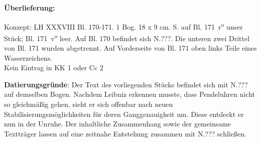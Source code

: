       
               
                \begin{ledgroupsized}[r]{120mm}
                \footnotesize 
                \pstart                
                \noindent\textbf{\"{U}berlieferung:}   
                \pend
                \end{ledgroupsized}
            
              
                            \begin{ledgroupsized}[r]{114mm}
                            \footnotesize 
                            \pstart \parindent -6mm
                            Konzept: LH XXXVIII Bl. 170-171. 1 Bog. 18 x 9 cm.  S. auf Bl. 171~r\textsuperscript{o} unser St\"{u}ck; Bl. 171~v\textsuperscript{o} leer. Auf Bl. 170 befindet sich N.???. Die unteren zwei Drittel von Bl. 171 wurden abgetrennt. Auf Vorderseite von Bl. 171 oben links Teile eines Wasserzeichens. \\Kein Eintrag in KK 1 oder Cc 2 \pend
                            \end{ledgroupsized}
                \vspace*{5mm}
                \begin{ledgroup}
                \footnotesize 
                \pstart
            \noindent\footnotesize{\textbf{Datierungsgr\"{u}nde}: Der Text des vorliegenden St\"{u}cks befindet sich mit N.??? auf demselben Bogen. Nachdem Leibniz erkennen musste, dass Pendeluhren nicht so gleichm\"{a}\ss{}ig gehen, sieht er sich offenbar nach neuen Stabilisierungsm\"{o}glichkeiten f\"{u}r deren Ganggenauigkeit um. Diese entdeckt er nun in der Unruhe. Der inhaltliche Zusammenhang sowie der gemeinsame Texttr\"{a}ger lassen auf eine zeitnahe Entstehung zusammen mit  N.??? schlie{\ss}en.}
                \pend
                \end{ledgroup}
            
